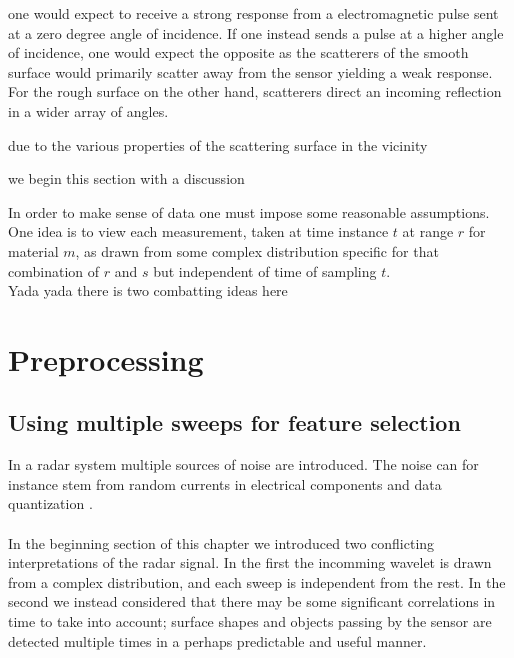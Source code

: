 
one would expect to receive a strong response from a electromagnetic pulse sent at a zero degree angle of incidence. If one instead sends a pulse at a higher angle of incidence, one would expect the opposite as the scatterers of the smooth surface would primarily scatter away from the sensor yielding a weak response. For the rough surface on the other hand, scatterers direct an incoming reflection in a wider array of angles. 



due to the various properties of the scattering surface in the vicinity 

we begin this section with a discussion 



In order to make sense of data one must impose some reasonable assumptions. 
\\ 
One idea is to view each measurement, taken at time instance $t$ at range $r$ for material $m$, as drawn from some 
complex distribution specific for that combination of $r$ and $s$ but independent of time of sampling $t$. 
\\
Yada yada there is two combatting ideas here

\section{Preprocessing}

\subsection{Using multiple sweeps for feature selection}

In a radar system multiple sources of noise are introduced. The noise can for instance stem from random currents in electrical components and data quantization \citep{w_doerry_2016}. 
\\ \\

In the beginning section of this chapter we introduced two conflicting interpretations of the radar signal. In the first the incomming wavelet is drawn from a complex distribution, and each sweep is independent from the rest. In the second we instead considered that there may be some significant correlations in time to take into account; surface shapes and objects passing by the sensor are detected multiple times in a perhaps predictable and useful manner.  

